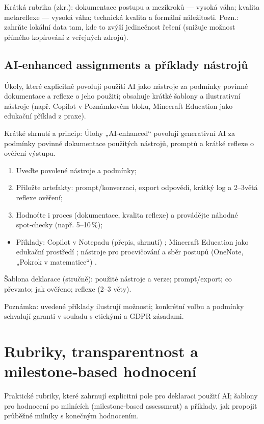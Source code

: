 \documentclass{report}%
\begin{document}
Krátká rubrika (zkr.): dokumentace postupu a mezikroků — vysoká váha; kvalita metareflexe — vysoká váha; technická kvalita a formální náležitosti. Pozn.: zahrňte lokální data tam, kde to zvýší jedinečnost řešení (snižuje možnost přímého kopírování z veřejných zdrojů).%

%
\subsection{AI‑enhanced assignments a příklady nástrojů}%
Úkoly, které explicitně povolují použití AI jako nástroje za podmínky povinné dokumentace a reflexe o jeho použití; obsahuje krátké šablony a ilustrativní nástroje (např. Copilot v Poznámkovém bloku, Minecraft Education jako edukační příklad z praxe).%


%
Krátké shrnutí a princip: Úlohy „AI‑enhanced“ povolují generativní AI za podmínky povinné dokumentace použitých nástrojů, promptů a krátké reflexe o ověření výstupu.

\begin{enumerate}
\item Uveďte povolené nástroje a podmínky;
\item Přiložte artefakty: prompt/konverzaci, export odpovědi, krátký log a 2–3větá reflexe ověření;
\item Hodnoťte i proces (dokumentace, kvalita reflexe) a provádějte náhodné spot‑checky (např. 5–10\,\%);
\end{enumerate}

\begin{itemize}\item Příklady: Copilot v Notepadu (přepis, shrnutí) \cite{kb_ai_101_tipu_pdf_04e4a115_page_14_1}; Minecraft Education jako edukační prostředí \cite{kb_ai_101_tipu_pdf_04e4a115_page_15_2}; nástroje pro procvičování a sběr postupů (OneNote, „Pokrok v matematice“) \cite{kb_ai_101_tipu_pdf_04e4a115_page_8_1}.\end{itemize}

Šablona deklarace (stručně): použité nástroje a verze; prompt/export; co převzato; jak ověřeno; reflexe (2–3 věty).

Poznámka: uvedené příklady ilustrují možnosti; konkrétní volbu a podmínky schvalují garanti v souladu s etickými a GDPR zásadami.%

%
\section{Rubriky, transparentnost a milestone‑based hodnocení}%
Praktické rubriky, které zahrnují explicitní pole pro deklaraci použití AI; šablony pro hodnocení po milnících (milestone‑based assessment) a příklady, jak propojit průběžné milníky s konečným hodnocením.%
\end{document}
